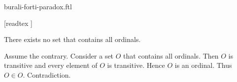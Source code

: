 \documentclass{article}
\begin{document}
\begin{smodule}{burali-forti-paradox.ftl}
  \begin{forthel}
    [readtex ]
  \end{forthel}

  \begin{ftheorem}[label=burali_forti_paradox,title=Burali-Forti's Paradox]
    There exists no set that contains all ordinals.
  \end{ftheorem}
  \begin{fproof}[method=contradiction]
    Assume the contrary.
    Consider a set $O$ that contains all ordinals.
    Then $O$ is transitive and every element of $O$ is transitive.
    Hence $O$ is an ordinal.
    Thus $O \in O$.
    Contradiction.
  \end{fproof}
\end{smodule}
\end{document}
